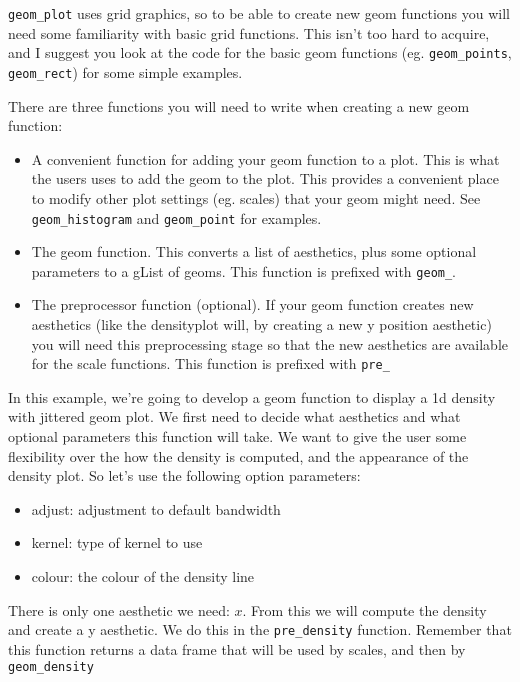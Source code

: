 {\tt geom\_plot} uses grid graphics, so to be able to create new geom functions you will need some familiarity with basic grid functions.  This isn't too hard to acquire, and I suggest you look at the code for the basic geom functions (eg. {\tt geom\_points}, {\tt geom\_rect}) for some simple examples.

There are three functions you will need to write when creating a new geom function:

\begin{itemize}
  \item A convenient function for adding your geom function to a plot.  This is what the users uses to add the geom to the plot.  This provides a convenient place to modify other plot settings (eg. scales) that your geom might need.  See {\tt geom\_histogram} and {\tt geom\_point} for examples.

  \item The geom function.  This converts a list of aesthetics, plus some optional parameters to a gList of geoms.  This function is prefixed with {\tt geom\_}.  
  
  \item The preprocessor function (optional).  If your geom function creates new aesthetics (like the densityplot will, by creating a new y position aesthetic) you will need this preprocessing stage so that the new aesthetics are available for the scale functions.  This function is prefixed with {\tt pre\_}
\end{itemize}

In this example, we're going to develop a geom function to display a 1d density with jittered geom plot.  We first need to decide what aesthetics and what optional parameters this function will take.  We want to give the user some flexibility over the how the density is computed, and the appearance of the density plot.  So let's use the following option parameters:

\begin{itemize}
  \item adjust: adjustment to default bandwidth
  \item kernel: type of kernel to use
  \item colour: the colour of the density line
\end{itemize}

There is only one aesthetic we need: $x$.  From this we will compute the density and create a y aesthetic.  We do this in the {\tt pre\_density} function.  Remember that this function returns a data frame that will be used by scales, and then by {\tt geom\_density}

